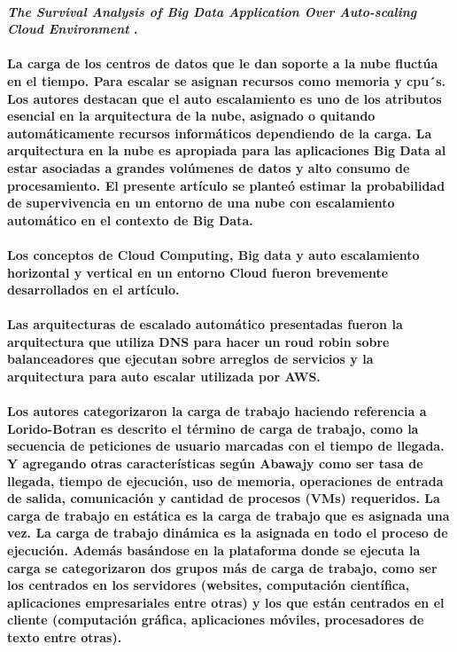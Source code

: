 \paragraph{
    \textbf{\emph{The Survival Analysis of Big Data Application
            Over Auto-scaling Cloud Environment}
    }
    \cite[pág. 155]{somani_emerging_2019}.
}

\paragraph{
    La carga de los centros de datos que le dan soporte a la nube fluctúa en el tiempo.
    Para escalar se asignan recursos como memoria y cpu´s.
    Los autores destacan que el auto escalamiento es uno de los atributos esencial en la arquitectura de la nube, asignado o quitando automáticamente recursos informáticos dependiendo de la carga.
    La arquitectura en la nube es apropiada para las aplicaciones Big Data al estar asociadas a grandes volúmenes de datos y alto consumo de procesamiento.
    El presente artículo se planteó estimar la probabilidad de supervivencia
    en un entorno de una nube con escalamiento automático en el contexto de Big Data.
}
\paragraph{
    Los conceptos de Cloud Computing, Big data y auto escalamiento horizontal y vertical en un entorno Cloud fueron brevemente desarrollados en el artículo.
}
\paragraph{
    Las arquitecturas de escalado automático presentadas fueron la arquitectura que utiliza DNS para hacer un roud robin sobre balanceadores que ejecutan sobre arreglos de servicios y la arquitectura para auto escalar utilizada por AWS.
}

\paragraph{
    Los autores categorizaron la carga de trabajo
    haciendo referencia a Lorido-Botran es descrito el término de carga de trabajo,
    como la secuencia de peticiones de usuario marcadas con el tiempo de llegada. Y agregando otras características según Abawajy como ser tasa de llegada, tiempo de ejecución, uso de memoria, operaciones de entrada de salida, comunicación y cantidad de procesos (VMs) requeridos. La carga de trabajo en estática
    es la carga de trabajo que es asignada una vez. La carga de trabajo dinámica es la asignada en todo el proceso de ejecución.
    Además basándose en la plataforma donde se ejecuta la carga se categorizaron dos grupos más de carga de trabajo, como ser los centrados en los servidores (websites, computación científica, aplicaciones empresariales entre otras) y los que están centrados en el cliente (computación gráfica, aplicaciones móviles, procesadores de texto entre otras).
}

